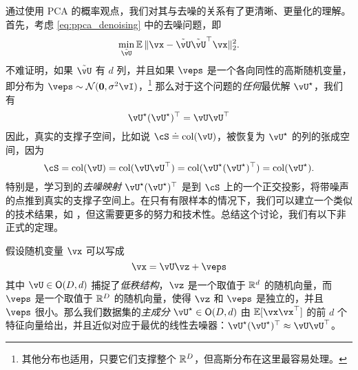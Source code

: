 \documentclass[../../book-main_zh.tex]{subfiles}
\begin{document}
\begin{remark}
    通过使用 PCA 的概率观点，我们对其与去噪的关系有了更清晰、更量化的理解。首先，考虑 \eqref{eq:ppca_denoising} 中的去噪问题，即
    \begin{equation}
        \min_{\tilde{\vU}}\Ex\norm{\vx - \tilde{\vU}\tilde{\vU}^{\top}\vx}_{2}^{2}.
    \end{equation}
    不难证明，如果 $\tilde{\vU}$ 有 $d$ 列，并且如果 \(\veps\) 是一个各向同性的高斯随机变量，即分布为 \(\veps \sim \dNorm(\vzero, \sigma^{2}\vI)\)，\footnote{其他分布也适用，只要它们支撑整个 \(\mathbb{R}^{D}\)，但高斯分布在这里最容易处理。} 那么对于这个问题的\textit{任何}最优解 \(\vU^{\star}\)，我们有
    \begin{equation}
        \vU^{\star}(\vU^{\star})^{\top} = \vU\vU^{\top}
    \end{equation}
    因此，真实的支撑子空间，比如说 \(\cS \doteq \mathop{\mathrm{col}}(\vU)\)，被恢复为 \(\vU^{\star}\) 的列的张成空间，因为
    \begin{equation}
        \cS = \mathop{\mathrm{col}}(\vU) = \mathop{\mathrm{col}}(\vU\vU^{\top})
        = \mathop{\mathrm{col}}(\vU^{\star}(\vU^{\star})^{\top})
        = \mathop{\mathrm{col}}(\vU^{\star}).
    \end{equation}
    特别是，学习到的\textit{去噪映射} \(\vU^{\star}(\vU^{\star})^{\top}\) 是到 \(\cS\) 上的一个正交投影，将带噪声的点推到真实的支撑子空间上。在只有有限样本的情况下，我们可以建立一个类似的技术结果，如 ，但这需要更多的努力和技术性。总结这个讨论，我们有以下非正式的定理。
\end{remark}


\begin{theorem}\label{thm:ppca}
    假设随机变量 \(\vx\) 可以写成
    \begin{equation}
        \vx = \vU\vz + \veps
    \end{equation}
    其中 \(\vU \in \O(D, d)\) 捕捉了\textit{低秩结构}，\(\vz\) 是一个取值于 \(\mathbb{R}^{d}\) 的随机向量，而 \(\veps\) 是一个取值于 \(\mathbb{R}^{D}\) 的随机向量，使得 \(\vz\) 和 \(\veps\) 是独立的，并且 \(\veps\) 很小。那么我们数据集的\textit{主成分} \(\vU^{\star} \in \O(D, d)\) 由 \(\Ex[\vx\vx^{\top}]\) 的前 \(d\) 个特征向量给出，并且近似对应于最优的线性去噪器：\(\vU^{\star}(\vU^{\star})^{\top} \approx \vU\vU^{\top}\)。
\end{theorem}

\end{document}
